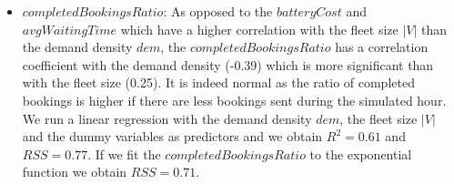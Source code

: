 \documentclass[12pt,a4paper]{article}
\begin{document}
\begin{itemize}
\item $completedBookingsRatio$: As opposed to the $batteryCost$ and $avgWaitingTime$ which have a higher correlation with the fleet size $|V|$ than the demand density $dem$, the $completedBookingsRatio$ has a correlation coefficient with the demand density (-0.39) which is more significant than with the fleet size (0.25). It is indeed normal as the ratio of completed bookings is higher if there are less bookings sent during the simulated hour. We run a linear regression with the demand density $dem$, the fleet size $|V|$ and the dummy variables as predictors and we obtain $R^{2} = 0.61$ and $RSS = 0.77$. If we fit the $completedBookingsRatio$ to the exponential function we obtain $RSS = 0.71$.

\end{itemize}
\end{document}
